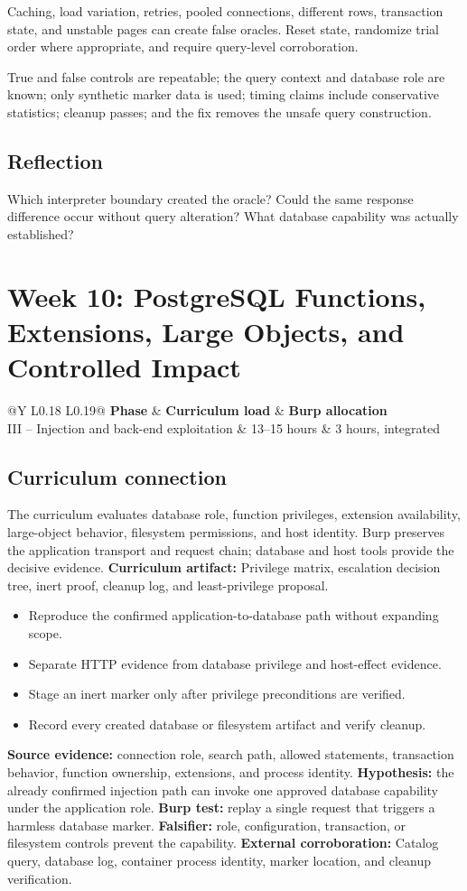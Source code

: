 \documentclass[11pt]{article}
\makeatletter
\newcommand{\weekheader}[5]{%
  \clearpage
  \section{Week #1: #2}
  \begin{tcolorbox}[colback=Navy,colframe=Navy,coltext=white]
    \begin{tabularx}{\linewidth}{@{}Y L{0.18\linewidth} L{0.19\linewidth}@{}}
      \textbf{Phase} & \textbf{Curriculum load} & \textbf{Burp allocation}\\
      #3 & #4 hours & #5 hours, integrated
    \end{tabularx}
  \end{tcolorbox}
}
\newcommand{\weekfield}[2]{%
  \Needspace{5\baselineskip}
  \subsection*{#1}
  #2
}
\newcommand{\curriculumartifact}[1]{\textbf{Curriculum artifact:} #1}
\newcommand{\externalproof}[1]{\textbf{External corroboration:} #1}
\makeatother
\begin{document}
\begin{troubleshootingbox}
Caching, load variation, retries, pooled connections, different rows, transaction
state, and unstable pages can create false oracles. Reset state, randomize trial
order where appropriate, and require query-level corroboration.
\end{troubleshootingbox}

\begin{checkpoints}
True and false controls are repeatable; the query context and database role are
known; only synthetic marker data is used; timing claims include conservative
statistics; cleanup passes; and the fix removes the unsafe query construction.
\end{checkpoints}

\weekfield{Reflection}{Which interpreter boundary created the oracle? Could the
same response difference occur without query alteration? What database capability
was actually established?}

\weekheader{10}{PostgreSQL Functions, Extensions, Large Objects, and Controlled Impact}{III -- Injection and back-end exploitation}{13--15}{3}

\weekfield{Curriculum connection}{The curriculum evaluates database role,
function privileges, extension availability, large-object behavior, filesystem
permissions, and host identity. Burp preserves the application transport and
request chain; database and host tools provide the decisive evidence.
\curriculumartifact{Privilege matrix, escalation decision tree, inert proof,
cleanup log, and least-privilege proposal.}}

\begin{objectivebox}
\begin{itemize}
  \item Reproduce the confirmed application-to-database path without expanding scope.
  \item Separate HTTP evidence from database privilege and host-effect evidence.
  \item Stage an inert marker only after privilege preconditions are verified.
  \item Record every created database or filesystem artifact and verify cleanup.
\end{itemize}
\end{objectivebox}

\begin{bridgebox}
\textbf{Source evidence:} connection role, search path, allowed statements,
transaction behavior, function ownership, extensions, and process identity.
\textbf{Hypothesis:} the already confirmed injection path can invoke one approved
database capability under the application role. \textbf{Burp test:} replay a
single request that triggers a harmless database marker. \textbf{Falsifier:}
role, configuration, transaction, or filesystem controls prevent the capability.
\externalproof{Catalog query, database log, container process identity, marker
location, and cleanup verification.}
\end{bridgebox}
\end{document}
